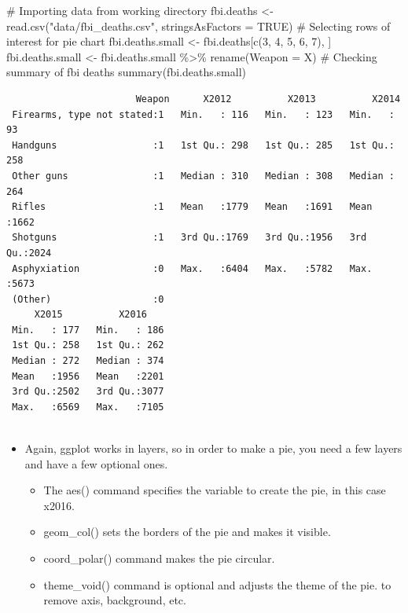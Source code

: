 \documentclass[
  letterpaper,
  DIV=11,
  numbers=noendperiod]{scrreprt}
\newenvironment{Shaded}{\begin{snugshade}}{\end{snugshade}}
\newcommand{\AttributeTok}[1]{\textcolor[rgb]{0.40,0.45,0.13}{#1}}
\newcommand{\CommentTok}[1]{\textcolor[rgb]{0.37,0.37,0.37}{#1}}
\newcommand{\ConstantTok}[1]{\textcolor[rgb]{0.56,0.35,0.01}{#1}}
\newcommand{\DecValTok}[1]{\textcolor[rgb]{0.68,0.00,0.00}{#1}}
\newcommand{\FunctionTok}[1]{\textcolor[rgb]{0.28,0.35,0.67}{#1}}
\newcommand{\NormalTok}[1]{\textcolor[rgb]{0.00,0.23,0.31}{#1}}
\newcommand{\OtherTok}[1]{\textcolor[rgb]{0.00,0.23,0.31}{#1}}
\newcommand{\SpecialCharTok}[1]{\textcolor[rgb]{0.37,0.37,0.37}{#1}}
\newcommand{\StringTok}[1]{\textcolor[rgb]{0.13,0.47,0.30}{#1}}
\providecommand{\tightlist}{%
  \setlength{\itemsep}{0pt}\setlength{\parskip}{0pt}}\usepackage{longtable,booktabs,array}
\begin{document}
\begin{Shaded}
\begin{Highlighting}[]
\CommentTok{\# Importing data from working directory}
\NormalTok{fbi.deaths }\OtherTok{\textless{}{-}} \FunctionTok{read.csv}\NormalTok{(}\StringTok{"data/fbi\_deaths.csv"}\NormalTok{, }\AttributeTok{stringsAsFactors =} \ConstantTok{TRUE}\NormalTok{)}
\CommentTok{\# Selecting rows of interest for pie chart}
\NormalTok{fbi.deaths.small }\OtherTok{\textless{}{-}}\NormalTok{ fbi.deaths[}\FunctionTok{c}\NormalTok{(}\DecValTok{3}\NormalTok{, }\DecValTok{4}\NormalTok{, }\DecValTok{5}\NormalTok{, }\DecValTok{6}\NormalTok{, }\DecValTok{7}\NormalTok{), ]}
\NormalTok{fbi.deaths.small }\OtherTok{\textless{}{-}}\NormalTok{ fbi.deaths.small }\SpecialCharTok{\%\textgreater{}\%}
    \FunctionTok{rename}\NormalTok{(}\AttributeTok{Weapon =}\NormalTok{ X)}
\CommentTok{\# Checking summary of fbi deaths}
\FunctionTok{summary}\NormalTok{(fbi.deaths.small)}
\end{Highlighting}
\end{Shaded}

\begin{verbatim}
                       Weapon      X2012          X2013          X2014     
 Firearms, type not stated:1   Min.   : 116   Min.   : 123   Min.   :  93  
 Handguns                 :1   1st Qu.: 298   1st Qu.: 285   1st Qu.: 258  
 Other guns               :1   Median : 310   Median : 308   Median : 264  
 Rifles                   :1   Mean   :1779   Mean   :1691   Mean   :1662  
 Shotguns                 :1   3rd Qu.:1769   3rd Qu.:1956   3rd Qu.:2024  
 Asphyxiation             :0   Max.   :6404   Max.   :5782   Max.   :5673  
 (Other)                  :0                                               
     X2015          X2016     
 Min.   : 177   Min.   : 186  
 1st Qu.: 258   1st Qu.: 262  
 Median : 272   Median : 374  
 Mean   :1956   Mean   :2201  
 3rd Qu.:2502   3rd Qu.:3077  
 Max.   :6569   Max.   :7105  
                              
\end{verbatim}

\begin{itemize}
\tightlist
\item
  Again, ggplot works in layers, so in order to make a pie, you need a
  few layers and have a few optional ones.

  \begin{itemize}
  \tightlist
  \item
    The aes() command specifies the variable to create the pie, in this
    case x2016.
  \item
    geom\_col() sets the borders of the pie and makes it visible.
  \item
    coord\_polar() command makes the pie circular.
  \item
    theme\_void() command is optional and adjusts the theme of the pie.
    to remove axis, background, etc.
  \end{itemize}
\end{itemize}
\end{document}
